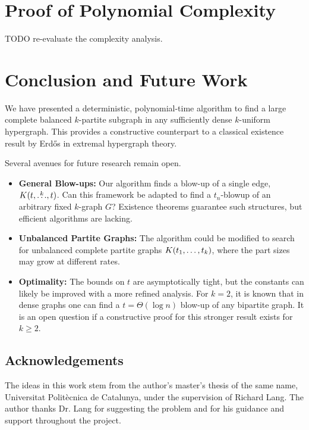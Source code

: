 \section{Proof of Polynomial Complexity}\label{sec:complexity}
TODO re-evaluate the complexity analysis. %

\section{Conclusion and Future Work}\label{sec:conclusion-and-future-work}

We have presented a deterministic,
polynomial-time algorithm to find a large complete balanced $k$-partite subgraph in any sufficiently dense $k$-uniform hypergraph.
This provides a constructive counterpart to a classical existence result by Erd\H{o}s in extremal hypergraph theory.

Several avenues for future research remain open.
\begin{itemize}
    \item \textbf{General Blow-ups:} Our algorithm finds a blow-up of a single edge, $K(t, \overset{k}{\dots}, t)$.
    Can this framework be adapted to find a $t_n$-blowup of an arbitrary fixed $k$-graph $G$? Existence theorems guarantee such structures, but efficient algorithms are lacking.
    \item \textbf{Unbalanced Partite Graphs:} The algorithm could be modified to search for unbalanced complete partite graphs $K(t_1, \dots, t_k)$, where the part sizes may grow at different rates.
    \item \textbf{Optimality:} The bounds on $t$ are asymptotically tight, but the constants can likely be improved with a more refined analysis.
    For $k=2$, it is known that in dense graphs one can find a $t=\Theta(\log n)$ blow-up of any bipartite graph.
    It is an open question if a constructive proof for this stronger result exists for $k \ge 2$.
\end{itemize}

\subsection*{Acknowledgements}

The ideas in this work stem from the author's master's thesis of the same name,
Universitat Polit\`{e}cnica de Catalunya,
under the supervision of Richard Lang.
The author thanks Dr. Lang for suggesting the problem and for his guidance and support throughout the project.
